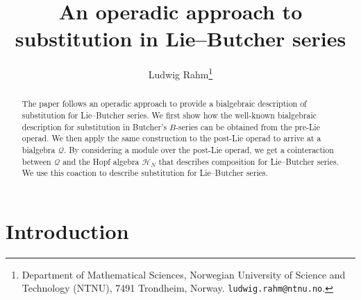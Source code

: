 \documentclass[10pt,a4paper]{article}
\title{An operadic approach to substitution in Lie--Butcher series}
\author{Ludwig Rahm\footnote{Department of Mathematical Sciences, Norwegian University of Science and Technology (NTNU), 7491 Trondheim, Norway. \texttt{ludwig.rahm@ntnu.no}.}}
\begin{document}
\maketitle

\begin{abstract}
The paper follows an operadic approach to provide a bialgebraic description of substitution for Lie--Butcher series. We first show how the well-known bialgebraic description for substitution in Butcher's $B$-series can be obtained from the pre-Lie operad. We then apply the same construction to the post-Lie operad to arrive at a bialgebra $\mathcal{Q}$. By considering a module over the post-Lie operad, we get a cointeraction between $\mathcal{Q}$ and the Hopf algebra $\mathcal{H}_N$ that describes composition for Lie--Butcher series. We use this coaction to describe substitution for Lie--Butcher series.
\end{abstract}

\tableofcontents

\section{Introduction}
\label{sec:intro}
\end{document}
